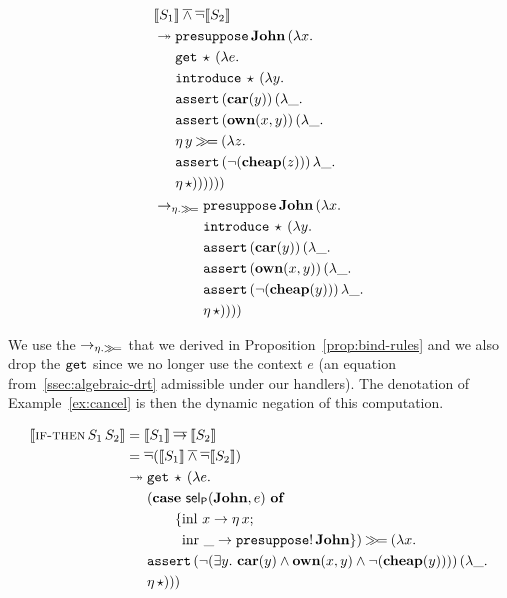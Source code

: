 \begin{align*}
  &\llbracket S_1 \rrbracket \mathbin{\overline{\land}} \mathop{\overline{\lnot}} \llbracket S_2 \rrbracket \\
  &\twoheadrightarrow \begin{aligned}[t]
      &\mathtt{presuppose}\,\textbf{John}\,(\lambda x.\,  \\
      &\mathtt{get}\,\star\,(\lambda e.\,  \\
      &\mathtt{introduce}\,\star\,(\lambda y.\,  \\
      &\mathtt{assert}\,(\textbf{car}(y))\,(\lambda \_.\,  \\
      &\mathtt{assert}\,(\textbf{own}(x, y))\,(\lambda \_.\,  \\
      &\eta\,y \mathbin{\gg\!=} (\lambda z.\,  \\
      &\mathtt{assert}\,(\lnot (\textbf{cheap}(z)))\,\lambda \_.\,  \\
      &\eta\,\star))))))
    \end{aligned} \\
  &\to_{\eta.\mathbin{\gg\!=}} \begin{aligned}[t]
      &\mathtt{presuppose}\,\textbf{John}\,(\lambda x.\,  \\
      &\mathtt{introduce}\,\star\,(\lambda y.\,  \\
      &\mathtt{assert}\,(\textbf{car}(y))\,(\lambda \_.\,  \\
      &\mathtt{assert}\,(\textbf{own}(x, y))\,(\lambda \_.\,  \\
      &\mathtt{assert}\,(\lnot (\textbf{cheap}(y)))\,\lambda \_.\,  \\
      &\eta\,\star))))
    \end{aligned}
\end{align*}

We use the $\to_{\eta.\mathbin{\gg\!=}}$ that we derived in
Proposition~\ref{prop:bind-rules} and we also drop the $\mathtt{get}$ since we
no longer use the context $e$ (an equation from~\ref{ssec:algebraic-drt}
admissible under our handlers). The denotation of Example~\ref{ex:cancel}
is then the dynamic negation of this computation.

\begin{align*}
  \llbracket \textsc{if-then}\,S_1\,S_2 \rrbracket
  &= \llbracket S_1 \rrbracket \mathbin{\overline{\to}} \llbracket S_2 \rrbracket \\
  &= \mathop{\overline{\lnot}} (\llbracket S_1 \rrbracket \mathbin{\overline{\land}} \mathop{\overline{\lnot}} \llbracket S_2 \rrbracket) \\
  &\twoheadrightarrow \begin{aligned}[t]
    &\mathtt{get}\,\star\,(\lambda e.\,  \\
    &(\text{\textbf{case} $\textsf{sel}_{\textsf{P}}(\textbf{John}, e)$ \textbf{of}} \\ &\qquad \{\operatorname{inl}\,x \to \eta\,x; \\ &\qquad \ \operatorname{inr}\,\_ \to \mathtt{presuppose}!\,\textbf{John} \}) \mathbin{\gg\!=} (\lambda x.\,  \\
    &\mathtt{assert}\,(\lnot (\exists y.\ \textbf{car}(y) \land \textbf{own}(x, y) \land \lnot (\textbf{cheap}(y))))\,(\lambda \_.\,  \\
    &\eta\,\star)))
    \end{aligned}
\end{align*}

